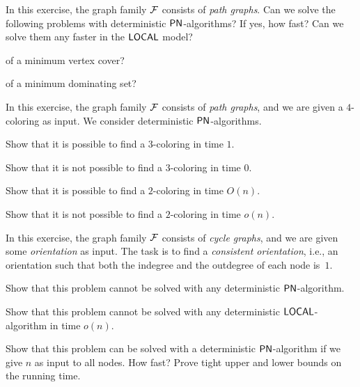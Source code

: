 \begin{ex}[approximation]
    In this exercise, the graph family $\mathcal{F}$ consists of \emph{path graphs}. Can we solve the following problems with deterministic $\textup{\sffamily PN}$-algorithms? If yes, how fast? Can we solve them any faster in the $\textup{\sffamily LOCAL}$ model?
    \begin{subex}
        \item {} of a minimum vertex cover?
        \item {} of a minimum dominating set?
    \end{subex}
\end{ex}

\begin{ex}
    In this exercise, the graph family $\mathcal{F}$ consists of \emph{path graphs}, and we are given a $4$-coloring as input. We consider deterministic $\textup{\sffamily PN}$-algorithms.
    \begin{subex}
        \item Show that it is possible to find a $3$-coloring in time $1$.
        \item Show that it is not possible to find a $3$-coloring in time $0$.
        \item Show that it is possible to find a $2$-coloring in time $O(n)$.
        \item Show that it is not possible to find a $2$-coloring in time $o(n)$.
    \end{subex}
\end{ex}

\begin{exs}[orientations]
    In this exercise, the graph family $\mathcal{F}$ consists of \emph{cycle graphs}, and we are given some \emph{orientation} as input. The task is to find a \emph{consistent orientation}, i.e., an orientation such that both the indegree and the outdegree of each node is~$1$.
    \begin{subex}
        \item Show that this problem cannot be solved with any deterministic $\textup{\sffamily PN}$-algorithm.
        \item Show that this problem cannot be solved with any deterministic $\textup{\sffamily LOCAL}$-algorithm in time $o(n)$.
        \item Show that this problem can be solved with a deterministic $\textup{\sffamily PN}$-algorithm if we give $n$ as input to all nodes. How fast? Prove tight upper and lower bounds on the running time.
    \end{subex}
\end{exs}


